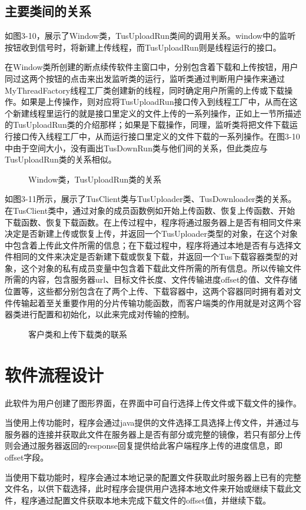 \documentclass[bachelor]{thesis-uestc}
\begin{document}
\subsection{主要类间的关系}
\par 如图3-10，展示了Window类，TusUploadRun类间的调用关系。window中的监听按钮收到信号时，将新建上传线程，而TusUploadRun则是线程运行的接口。
\par 在Window类所创建的断点续传软件主窗口中，分别包含着下载和上传按钮，用户同过这两个按钮的点击来出发监听类的运行，监听类通过判断用户操作来通过MyThreadFactory线程工厂类创建新的线程，同时确定用户所需的上传或下载操作。如果是上传操作，则对应将TusUploadRun接口传入到线程工厂中，从而在这个新建线程里运行的就是接口里定义的文件上传的一系列操作，正如上一节所描述的TusUploadRun类的介绍那样；如果是下载操作，同理，监听类将把文件下载运行接口传入线程工厂中，从而运行接口里定义的文件下载的一系列操作。在图3-10中由于空间大小，没有画出TusDownRun类与他们间的关系，但此类应与TusUploadRun类的关系相似。
\begin{figure}[h]
\caption{Window类，TusUploadRun类的关系}
\end{figure}
\par 如图3-11所示，展示了TusClient类与TusUploader类、TusDownloader类的关系。在TusClient类中，通过对象的成员函数例如开始上传函数、恢复上传函数、开始下载函数、恢复下载函数。在上传过程中，程序将通过服务器上是否有相同文件来决定是否新建上传或恢复上传，并返回一个TusUploader类型的对象，在这个对象中包含着上传此文件所需的信息；在下载过程中，程序将通过本地是否有与选择文件相同的文件来决定是否新建下载或恢复下载，并返回一个Tus下载容器类型的对象，这个对象的私有成员变量中包含着下载此文件所需的所有信息。所以传输文件所需的内容，包含服务器url、目标文件长度、文件传输进度offset的值、文件存储位置等，这些都分别包含在了两个上传、下载容器中，这两个容器同时拥有着对文件传输起着至关重要作用的分片传输功能函数，而客户端类的作用就是对这两个容器类进行配置和初始化，以此来完成对传输的控制。
\begin{figure}[h]
\caption{客户类和上传下载类的联系}
\end{figure}

\section{软件流程设计}
此软件为用户创建了图形界面，在界面中可自行选择上传文件或下载文件的操作。
\par 当使用上传功能时，程序会通过java提供的文件选择工具选择上传文件，并通过与服务器的连接并获取此文件在服务器上是否有部分或完整的镜像，若只有部分上传则会通过服务器返回的response回复提供给此客户端程序上传的进度信息，即offset字段。
\par 当使用下载功能时，程序会通过本地记录的配置文件获取此时服务器上已有的完整文件名，以供下载选择，此时程序会提供用户选择本地文件来开始或继续下载此文件，程序通过配置文件获取本地未完成下载文件的offset值，并继续下载。
\end{document}
